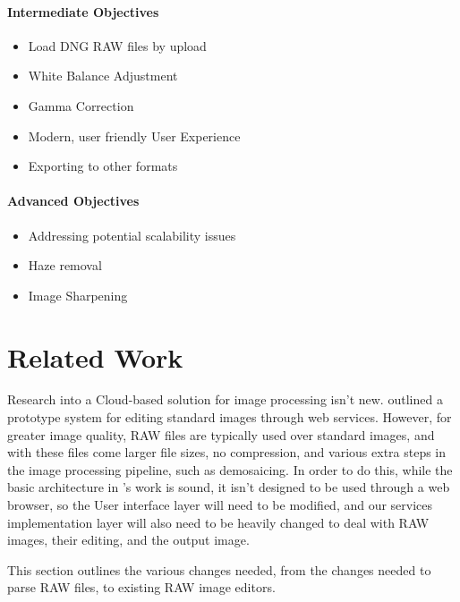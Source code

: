 \documentclass[10pt,a4paper]{article}
\begin{document}
\paragraph{Intermediate Objectives}
    \begin{itemize}
      \item Load DNG RAW files by upload
      \item White Balance Adjustment
      \item Gamma Correction
      \item Modern, user friendly User Experience
      \item Exporting to other formats
    \end{itemize}
\paragraph{Advanced Objectives}
    \begin{itemize}
      \item Addressing potential scalability issues
      \item Haze removal
      \item Image Sharpening
    \end{itemize}
\section{Related Work}
Research into a Cloud-based solution for image processing isn't new. \cite{WebServiceImageProcessing} outlined a prototype
system for editing standard images through web services. However, for greater image quality, RAW files are typically used
over standard images, and with these files come larger file sizes, no compression, and various extra steps in the image processing
pipeline, such as demosaicing. In order to do this, while the basic architecture in \citeauthor{WebServiceImageProcessing}'s work is sound,
it isn't designed to be used through a web browser, so the User interface layer will need to be modified, and our services implementation layer
will also need to be heavily changed to deal with RAW images, their editing, and the output image.

This section outlines the various changes needed, from the changes needed to parse RAW files, to existing RAW image editors.
\end{document}
